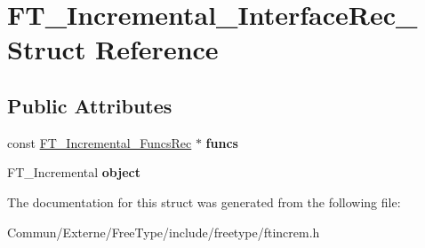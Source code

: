 \hypertarget{struct_f_t___incremental___interface_rec__}{}\section{F\+T\+\_\+\+Incremental\+\_\+\+Interface\+Rec\+\_\+ Struct Reference}
\label{struct_f_t___incremental___interface_rec__}
\subsection*{Public Attributes}
\begin{DoxyCompactItemize}
\item 
const \hyperlink{struct_f_t___incremental___funcs_rec__}{F\+T\+\_\+\+Incremental\+\_\+\+Funcs\+Rec} $\ast$ {\bfseries funcs}\hypertarget{struct_f_t___incremental___interface_rec___acd254ae2bdd80b4c9218a484c6bc2a41}{}\label{struct_f_t___incremental___interface_rec___acd254ae2bdd80b4c9218a484c6bc2a41}

\item 
F\+T\+\_\+\+Incremental {\bfseries object}\hypertarget{struct_f_t___incremental___interface_rec___ae4f527f53465ff84ad01b484fe721a88}{}\label{struct_f_t___incremental___interface_rec___ae4f527f53465ff84ad01b484fe721a88}

\end{DoxyCompactItemize}


The documentation for this struct was generated from the following file\+:\begin{DoxyCompactItemize}
\item 
Commun/\+Externe/\+Free\+Type/include/freetype/ftincrem.\+h\end{DoxyCompactItemize}
